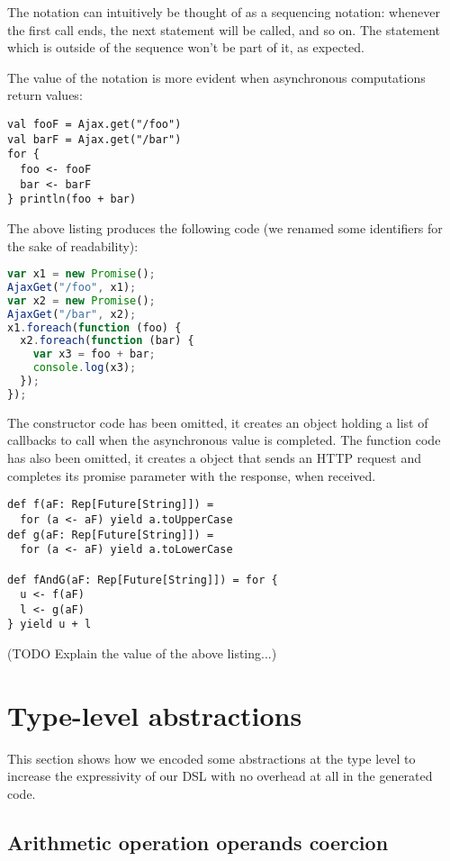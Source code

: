 \documentclass[american,english,runningheads]{llncs}
\begin{document}
The  notation can intuitively be thought of as a sequencing notation: whenever the first  call ends, the next statement will be called, and so on. The  statement which is outside of the sequence won’t be part of it, as expected.

The value of the  notation is more evident when asynchronous computations return values:

\begin{lstlisting}
val fooF = Ajax.get("/foo")
val barF = Ajax.get("/bar")
for {
  foo <- fooF
  bar <- barF
} println(foo + bar)
\end{lstlisting}

The above listing produces the following code (we renamed some identifiers for the sake of readability):

\begin{lstlisting}[language=JavaScript]
var x1 = new Promise();
AjaxGet("/foo", x1);
var x2 = new Promise();
AjaxGet("/bar", x2);
x1.foreach(function (foo) {
  x2.foreach(function (bar) {
    var x3 = foo + bar;
    console.log(x3);
  });
});
\end{lstlisting}

The  constructor code has been omitted, it creates an object holding a list of callbacks to call when the asynchronous value is completed. The  function code has also been omitted, it creates a  object that sends an HTTP request and completes its promise parameter with the response, when received.

\begin{lstlisting}
def f(aF: Rep[Future[String]]) =
  for (a <- aF) yield a.toUpperCase
def g(aF: Rep[Future[String]]) =
  for (a <- aF) yield a.toLowerCase

def fAndG(aF: Rep[Future[String]]) = for {
  u <- f(aF)
  l <- g(aF)
} yield u + l
\end{lstlisting}

(TODO Explain the value of the above listing...)

\section{Type-level abstractions}
\label{type-level}

This section shows how we encoded some abstractions at the type level to increase the expressivity of our DSL with no overhead at all in the generated code.

\subsection{Arithmetic operation operands coercion}
\end{document}
